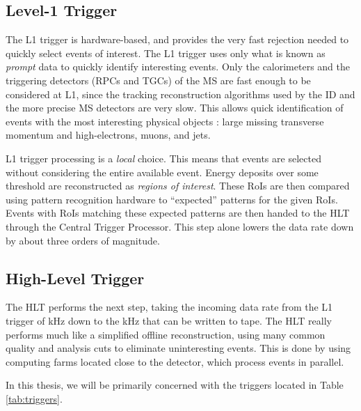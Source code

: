 \subsection{Level-1 Trigger}

The L1 trigger is hardware-based, and provides the very fast rejection needed to quickly select events of interest.
The L1 trigger uses only what is known as \textit{prompt} data to quickly identify interesting events.
Only the calorimeters and the triggering detectors (RPCs and TGCs)  of the MS are fast enough to be considered at L1, since the tracking reconstruction algorithms used by the ID and the more precise MS detectors are very slow.
This allows quick identification of events with the most interesting physical objects : large missing transverse momentum and high-\pt electrons, muons, and jets.

L1 trigger processing is a \textit{local} choice.
This means that events are selected without considering the entire available event.
Energy deposits over some threshold are reconstructed as \textit{regions of interest}.
These RoIs are then compared using pattern recognition hardware to ``expected'' patterns for the given RoIs.
Events with RoIs matching these expected patterns are then handed to the HLT through the Central Trigger Processor.
This step alone lowers the data rate down by about three orders of magnitude.

\subsection{High-Level Trigger}

The HLT performs the next step, taking the incoming data rate from the L1 trigger of  kHz down to the  kHz that can be written to tape.
The HLT really performs much like a simplified offline reconstruction, using many common quality and analysis cuts to eliminate uninteresting events.
This is done by using computing farms located close to the detector, which process events in parallel.

In this thesis, we will be primarily concerned with the triggers located in Table \ref{tab:triggers}.


